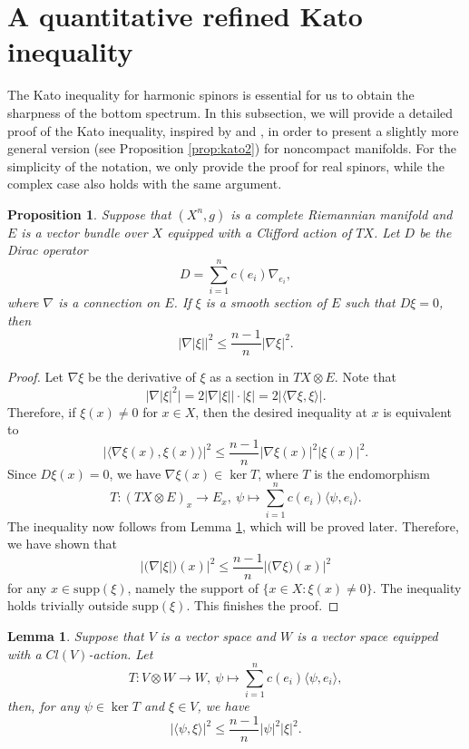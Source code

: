 \documentclass[12pt, reqno]{amsart}
\theoremstyle{plain}%
\newtheorem{proposition}[theorem]{Proposition}
\newtheorem{lemma}[theorem]{Lemma}
\theoremstyle{definition}
\theoremstyle{remark}
\numberwithin{equation}{section}
\newcommand{\supp}{\mathrm{supp}}
\begin{document}
\section{A quantitative refined Kato inequality} \label{sec: Kato}

The Kato inequality for harmonic spinors is essential for us to obtain the sharpness of the bottom spectrum. In this subsection, we will provide a detailed proof of the Kato inequality, inspired by \cite[Section 4.1]{Davaux} and \cite{CGH00}, in order to present a slightly more general version (see Proposition \ref{prop:kato2}) for noncompact manifolds. For the simplicity of the notation, we only provide the proof for real spinors, while the complex case also holds with the same argument.

\begin{proposition}\label{prop:kato}
	Suppose that $(X^n,g)$ is a complete Riemannian manifold and $E$ is a vector bundle over $X$ equipped with a Clifford action of $TX$. Let $D$ be the Dirac operator
	$$D=\sum_{i=1}^n c(e_i)\nabla_{e_i},$$
	where $\nabla$ is a connection on $E$.
	If $\xi$ is a smooth section of $E$ such that $D\xi=0$, then
	$$\Big|\nabla|\xi|\Big|^2\leq \frac{n-1}{n}|\nabla\xi|^2.$$
\end{proposition}
\begin{proof}
	Let $\nabla\xi$ be the derivative of $\xi$ as a section in $TX\otimes E$.
	Note that
	$$\Big|\nabla|\xi|^2\Big|=2\Big|\nabla|\xi|\Big|\cdot|\xi|=2\Big|\langle\nabla\xi,\xi\rangle\Big|.$$
	Therefore, if $\xi(x)\ne 0$ for $x\in X$, then the desired inequality at $x$ is equivalent to
	$$\Big|\langle\nabla\xi(x),\xi(x)\rangle\Big|^2\leq \frac{n-1}{n}|\nabla\xi(x)|^2|\xi(x)|^2.$$
	Since $D\xi(x)=0$, we have $\nabla\xi(x)\in\ker T$, where $T$ is the endomorphism
	$$T\colon (TX\otimes E)_x\to E_x,~\psi\mapsto \sum_{i=1}^n c(e_i)\langle\psi,e_i\rangle.$$
	The inequality now follows from Lemma \ref{lemma:kato}, which will be proved later. Therefore, we have shown that
	$$\Big|\big(\nabla|\xi|\big)(x)\Big|^2\leq \frac{n-1}{n}|\big(\nabla\xi\big)(x)|^2$$
	for any $x\in\supp(\xi)$, namely the support of $\{x\in X:\xi(x)\ne 0\}$. The inequality holds trivially outside $\supp(\xi)$. This finishes the proof.
\end{proof}
\begin{lemma}\label{lemma:kato}
	Suppose that $V$ is a vector space and  $W$ is a vector space equipped with a $Cl(V)$-action. Let
	$$T\colon V\otimes W\to W,~\psi\mapsto \sum_{i=1}^n c(e_i)\langle\psi,e_i\rangle,$$
	then, for any $\psi\in \ker T$ and $\xi\in V$, we have
	$$\Big|\langle\psi,\xi\rangle\Big|^2\leq \frac{n-1}{n}|\psi|^2|\xi|^2.$$
\end{lemma}
\end{document}
